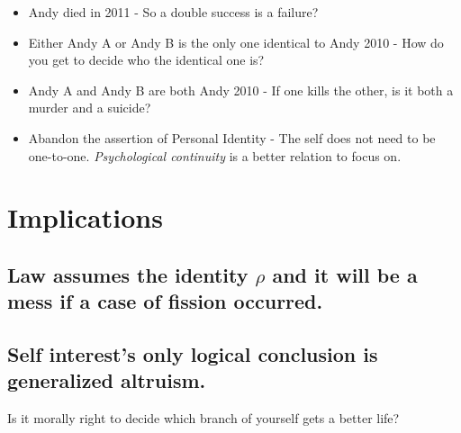 \documentclass[11pt]{article}
\begin{document}
\begin{itemize}
\item Andy died in 2011 -
\label{sec:org4b72610}
So a double success is a failure?

\item Either Andy A or Andy B is the only one identical to Andy 2010 -
\label{sec:orge42b6ce}
How do you get to decide who the identical one is?

\item Andy A and Andy B are both Andy 2010 -
\label{sec:org56c1f1a}
If one kills the other, is it both a murder and a suicide?

\item Abandon the assertion of Personal Identity -
\label{sec:orga5dfa88}
The self does not need to be one-to-one. \emph{Psychological continuity} is a better relation to focus on.
\end{itemize}

\section{Implications}
\label{sec:org58a4b99}
\subsection{Law assumes the identity \(\rho\) and it will be a mess if a case of fission occurred.}
\label{sec:org6646224}
\subsection{Self interest's only logical conclusion is generalized altruism.}
\label{sec:org0960d61}
Is it morally right to decide which branch of yourself gets a better life?
\end{document}
